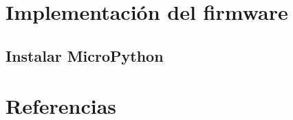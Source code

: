 


	

	\null\newpage %

	\tableofcontents
	
	\chapter{Implementación del firmware}
    \section{Instalar MicroPython}
	 	    
	 	    
  \chapter{Referencias}      
    \printbibliography[heading=none]


